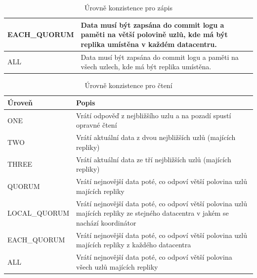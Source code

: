 \begin{table}
\begin{tabularx}{\textwidth}{ |l|X| }
    EACH\_QUORUM & Data musí být zapsána do commit logu a paměti na větší polovině uzlů, kde má být replika umístěna v každém datacentru.                                                                                                                                                                  \\ \hline
    ALL          & Data musí být zapsána do commit logu a paměti na všech uzlech, kde má být replika umístěna.                                                                                                                                                                                             \\ \hline
    \end{tabularx}
    \caption {Úrovně konzistence pro zápis}
\label{casawrites}

\end{table}


\begin{table}[!h]
\begin{tabularx}{\textwidth}{ |l|X| }

    \hline
    Úroveň       & Popis                                                                                                                    \\ \hline
    ONE          & Vrátí odpověď z nejbližšího uzlu a na pozadí spustí opravné čtení                                                        \\ \hline
    TWO          & Vrátí aktuální data z dvou nejbližších uzlů (majících repliky)                                                           \\ \hline
    THREE        & Vrátí aktuální data ze tří nejbližších uzlů (majících repliky)                                                           \\ \hline
    QUORUM       & Vrátí nejnovější data poté, co odpoví větší polovina uzlů majících repliky                                               \\ \hline
    LOCAL\_QUORUM & Vrátí nejnovější data poté, co odpoví větší polovina uzlů majících repliky ze stejného datacentra v jakém se nachází koordinátor \\ \hline
    EACH\_QUORUM & Vrátí nejnovější data poté, co odpoví větší polovina uzlů majících repliky z každého datacentra                          \\ \hline
    ALL          & Vrátí nejnovější data poté, co odpoví větší polovina všech uzlů majících repliky                                         \\ \hline
    \end{tabularx}
    \caption {Úrovně konzistence pro čtení}
\label{casareads}

\end{table}


